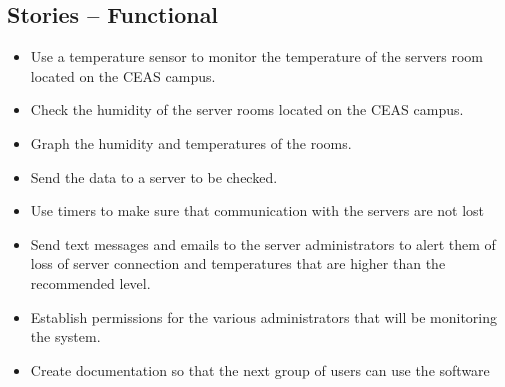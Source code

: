 \documentclass{report}
\begin{document}
\subsection*{Stories -- Functional}
\begin {itemize}
\item Use a temperature sensor to monitor the temperature of the servers room located on the CEAS campus.
\item Check the humidity of the server rooms located on the CEAS campus.
\item Graph the humidity and temperatures of the rooms.
\item Send the data to a server to be checked.
\item Use timers to make sure that communication with the servers are not lost
\item Send text messages and emails to the server administrators to alert them of loss of server connection and temperatures that are higher than the recommended level.
\item Establish permissions for the various administrators that will be monitoring the system.
\item Create documentation so that the next group of users can use the software
\end {itemize}
\newpage
\end{document}
